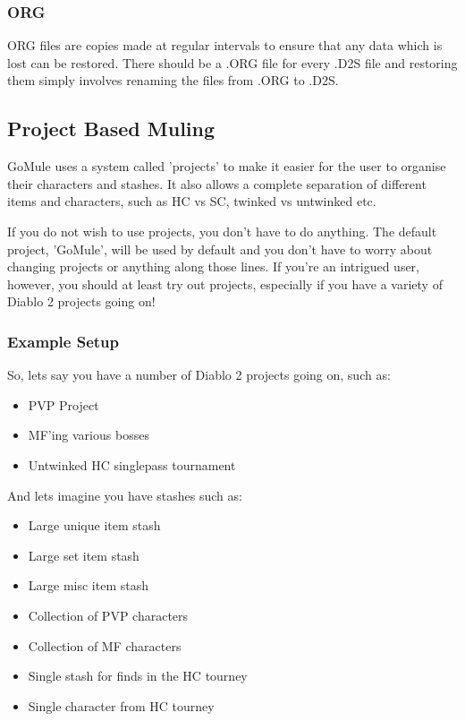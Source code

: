 \documentclass[a4paper,10pt]{article}
\begin{document}
\subsubsection{ORG}

ORG files are copies made at regular intervals to ensure that any data which is lost can be restored. There should be a .ORG file for every .D2S file and restoring them simply involves renaming the files from .ORG to .D2S.


\subsection{Project Based Muling}

GoMule uses a system called 'projects' to make it easier for the user to organise their characters and stashes. It also allows a complete separation of different items and characters, such as HC vs SC, twinked vs untwinked etc.

If you do not wish to use projects, you don't have to do anything. The default project, 'GoMule', will be used by default and you don't have to worry about changing projects or anything along those lines. If you're an intrigued user, however, you should at least try out projects, especially if you have a variety of Diablo 2 projects going on!

\subsubsection{Example Setup}

So, lets say you have a number of Diablo 2 projects going on, such as: 

\begin{itemize}
 \item PVP Project
 \item MF'ing various bosses
 \item Untwinked HC singlepass tournament
\end{itemize}

And lets imagine you have stashes such as:

\begin{itemize}
 \item Large unique item stash
\item Large set item stash
\item Large misc item stash
 \item Collection of PVP characters
\item Collection of MF characters
 \item Single stash for finds in the HC tourney
\item Single character from HC tourney
\end{itemize}
\end{document}
